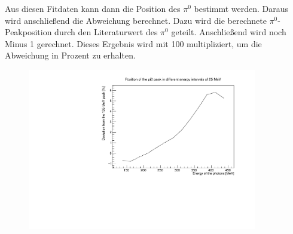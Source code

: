 \documentclass[a4paper,11pt,oneside,final,german,openbib,pdftex]{scrbook}
\begin{document}
{  %
  
 
%		
 
 
 Aus diesen Fitdaten kann dann die Position des $\pi^0$ bestimmt werden. Daraus wird anschlie{\ss}end die Abweichung berechnet. Dazu wird die berechnete $\pi^0$-Peakposition durch den Literaturwert des $\pi^0$ geteilt. Anschlie{\ss}end wird noch Minus 1 gerechnet. Dieses Ergebnis wird mit 100 multipliziert, um die Abweichung in Prozent zu erhalten.
 
 \begin{figure}[h!]
 	\begin{center}
 		\includegraphics[width=100mm]{NewCalib/Strahlzeit2014/20171904RealUnchargedDeviation}
 	

\end{center}
\end{figure}}
\end{document}
